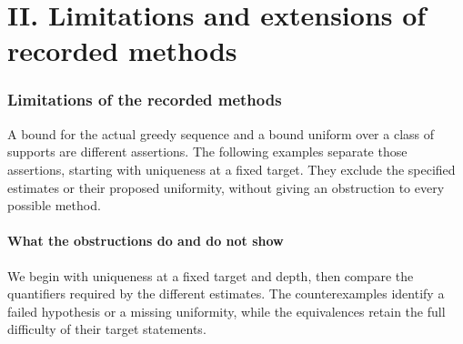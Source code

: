 \documentclass[11pt]{article}
\theoremstyle{plain}
\theoremstyle{definition}
\theoremstyle{remark}
\begin{document}
\clearpage
\part*{II. Limitations and extensions of recorded methods}
\section{Limitations of the recorded methods}
\label{sec:257-wall}
A bound for the actual greedy sequence and a bound uniform over a class
of supports are different assertions. The following examples separate
those assertions, starting with uniqueness at a fixed target. They
exclude the specified estimates or their proposed uniformity, without
giving an obstruction to every possible method.


\subsection{What the obstructions do and do not show}

We begin with uniqueness at a fixed target and depth, then compare the
quantifiers required by the different estimates. The counterexamples
identify a failed hypothesis or a missing uniformity, while the
equivalences retain the full difficulty of their target statements.
\end{document}
